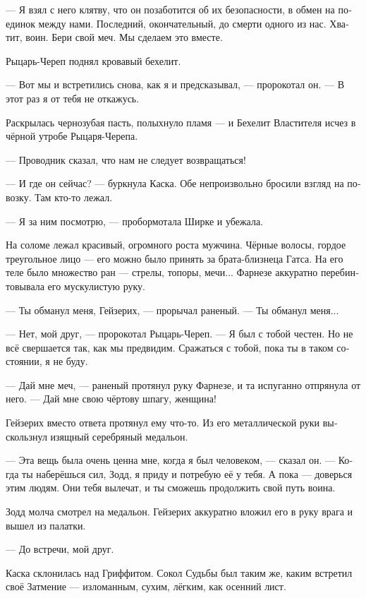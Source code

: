 \documentclass[a4paper,12pt,fleqn]{book}\usepackage{polyglossia}\setdefaultlanguage[babelshorthands=true]{russian}\setotherlanguage{english}\defaultfontfeatures{Ligatures=TeX,Mapping=tex-text}\usepackage{xcolor}\newcommand{\ml}[3]{#2}
\newcommand{\textspace}{\vspace{1em}{\centering\Large\bfseries<...>\par}\vspace{1em}}
\begin{document}
--- Я взял с него клятву, что он позаботится об их безопасности, в обмен на поединок между нами.
Последний, окончательный, до смерти одного из нас.
Хватит, воин.
Бери свой меч.
Мы сделаем это вместе.

\textspace

Рыцарь-Череп поднял кровавый бехелит.

--- Вот мы и встретились снова, как я и предсказывал, --- пророкотал он.
--- В этот раз я от тебя не откажусь.

Раскрылась чернозубая пасть, полыхнуло пламя --- и Бехелит Властителя исчез в чёрной утробе Рыцаря-Черепа.

\textspace

--- Проводник сказал, что нам не следует возвращаться!

--- И где он сейчас? --- буркнула Каска.
Обе непроизвольно бросили взгляд на повозку.
Там кто-то лежал.

--- Я за ним посмотрю, --- пробормотала Ширке и убежала.

\textspace

На соломе лежал красивый, огромного роста мужчина.
Чёрные волосы, гордое треугольное лицо --- его можно было принять за брата-близнеца Гатса.
На его теле было множество ран --- стрелы, топоры, мечи...
Фарнезе аккуратно перебинтовывала его мускулистую руку.

--- Ты обманул меня, Гейзерих, --- прорычал раненый.
--- Ты обманул меня...

--- Нет, мой друг, --- пророкотал Рыцарь-Череп.
--- Я был с тобой честен.
Но не всё свершается так, как мы предвидим.
Сражаться с тобой, пока ты в таком состоянии, я не буду.

--- Дай мне меч, --- раненый протянул руку Фарнезе, и та испуганно отпрянула от него.
--- Дай мне свою чёртову шпагу, женщина!

Гейзерих вместо ответа протянул ему что-то.
Из его металлической руки выскользнул изящный серебряный медальон.

--- Эта вещь была очень ценна мне, когда я был человеком, --- сказал он.
--- Когда ты наберёшься сил, Зодд, я приду и потребую её у тебя.
А пока --- доверься этим людям.
Они тебя вылечат, и ты сможешь продолжить свой путь воина.

Зодд молча смотрел на медальон.
Гейзерих аккуратно вложил его в руку врага и вышел из палатки.

--- До встречи, мой друг.

\textspace

Каска склонилась над Гриффитом.
Сокол Судьбы был таким же, каким встретил своё Затмение --- изломанным, сухим, лёгким, как осенний лист.
\end{document}
